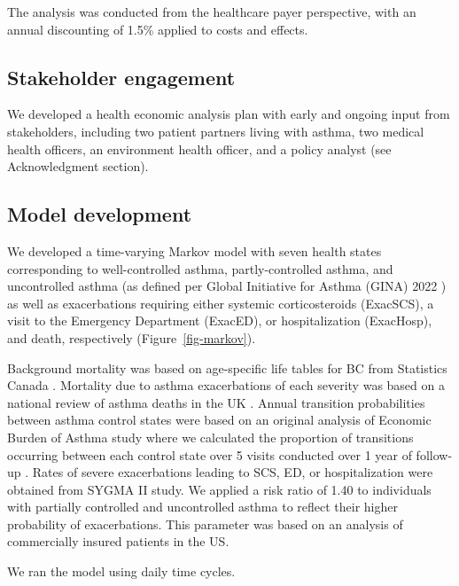 \documentclass[
  number]{elsarticle}
\begin{document}
The analysis was conducted from the healthcare payer perspective, with
an annual discounting of 1.5\% applied to costs and effects.

\hypertarget{stakeholder-engagement}{%
\subsection{Stakeholder engagement}\label{stakeholder-engagement}}

We developed a health economic analysis plan with early and ongoing
input from stakeholders, including two patient partners living with
asthma, two medical health officers, an environment health officer, and
a policy analyst (see Acknowledgment section).

\hypertarget{model-development}{%
\subsection{Model development}\label{model-development}}

We developed a time-varying Markov model with seven health states
corresponding to well-controlled asthma, partly-controlled asthma, and
uncontrolled asthma (as defined per Global Initiative for Asthma (GINA)
2022 \citep{globalinitiativeforasthma2022}) as well as exacerbations
requiring either systemic corticosteroids (ExacSCS), a visit to the
Emergency Department (ExacED), or hospitalization (ExacHosp), and death,
respectively (Figure~\ref{fig-markov}).

Background mortality was based on age-specific life tables for BC from
Statistics Canada \citep{statisticscanada2022}. Mortality due to asthma
exacerbations of each severity was based on a national review of asthma
deaths in the UK \citep{watson2007, levy2014asthma}. Annual transition
probabilities between asthma control states were based on an original
analysis of Economic Burden of Asthma study where we calculated the
proportion of transitions occurring between each control state over 5
visits conducted over 1 year of follow-up \citep{sadatsafavi2015}. Rates
of severe exacerbations leading to SCS, ED, or hospitalization were
obtained from SYGMA II study\citep{bateman2018}. We applied a risk ratio
of 1.40 to individuals with partially controlled and uncontrolled asthma
to reflect their higher probability of exacerbations. This parameter was
based on an analysis of commercially insured patients in the
US\citep{pollack2022}.

We ran the model using daily time cycles.
\end{document}
